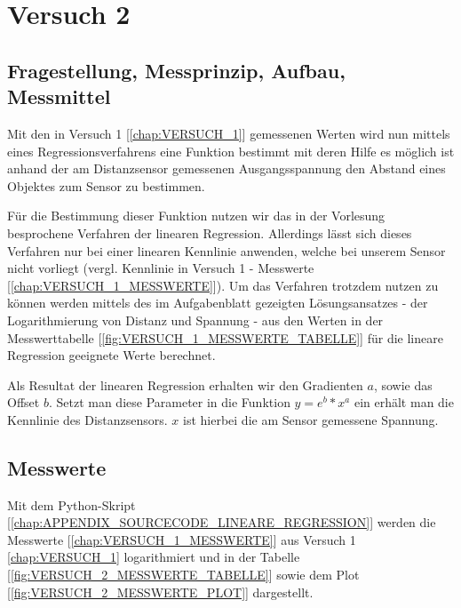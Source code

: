 \documentclass[12pt,oneside,a4paper]{report}
\begin{document}
\chapter{Versuch 2}
\label{chap:VERSUCH_2}

\section{Fragestellung, Messprinzip, Aufbau, Messmittel}
\label{chap:VERSUCH_2_FRAGESTELLUNG}
Mit den in Versuch 1 [\ref{chap:VERSUCH_1}] gemessenen Werten wird nun mittels eines Regressionsverfahrens eine Funktion bestimmt mit deren Hilfe es möglich ist anhand der am Distanzsensor gemessenen Ausgangsspannung den Abstand eines Objektes zum Sensor zu bestimmen.

Für die Bestimmung dieser Funktion nutzen wir das in der Vorlesung besprochene Verfahren der linearen Regression. Allerdings lässt sich dieses Verfahren nur bei einer linearen Kennlinie anwenden, welche bei unserem Sensor nicht vorliegt (vergl. Kennlinie in Versuch 1 - Messwerte [\ref{chap:VERSUCH_1_MESSWERTE}]). Um das Verfahren trotzdem nutzen zu können werden mittels des im Aufgabenblatt gezeigten Lösungsansatzes - der Logarithmierung von Distanz und Spannung - aus den Werten in der Messwerttabelle [\ref{fig:VERSUCH_1_MESSWERTE_TABELLE}] für die lineare Regression geeignete Werte berechnet.

Als Resultat der linearen Regression erhalten wir den Gradienten \(a\), sowie das Offset \(b\). Setzt man diese Parameter in die Funktion \(y = e^b * x^a\) ein erhält man die Kennlinie des Distanzsensors. \(x\) ist hierbei die am Sensor gemessene Spannung.

\section{Messwerte}
\label{chap:VERSUCH_2_MESSWERTE}
Mit dem Python-Skript [\ref{chap:APPENDIX_SOURCECODE_LINEARE_REGRESSION}] werden die Messwerte [\ref{chap:VERSUCH_1_MESSWERTE}] aus Versuch 1 \ref{chap:VERSUCH_1} logarithmiert und in der Tabelle [\ref{fig:VERSUCH_2_MESSWERTE_TABELLE}] sowie dem Plot [\ref{fig:VERSUCH_2_MESSWERTE_PLOT}] dargestellt.
\end{document}
